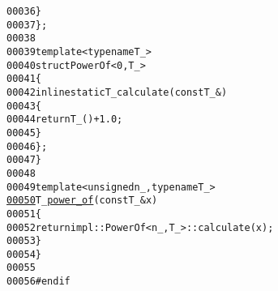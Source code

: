\begin{footnotesize}
\begin{alltt}
00036             \}
00037         \};
00038 
00039         \textcolor{keyword}{template} <\textcolor{keyword}{typename} T\_>
00040         \textcolor{keyword}{struct }PowerOf<0, T\_>
00041         \{
00042             \textcolor{keyword}{inline} \textcolor{keyword}{static} T\_ calculate(\textcolor{keyword}{const} T\_ &)
00043             \{
00044                 \textcolor{keywordflow}{return} T\_() + 1.0;
00045             \}
00046         \};
00047     \}
00048 
00049     \textcolor{keyword}{template} <\textcolor{keywordtype}{unsigned} n\_, \textcolor{keyword}{typename} T\_>
\hypertarget{power__of_8hh_source_l00050}{}\hyperlink{namespaceeos_a89d53e5e358a7428b14c811668193e3f}{00050}     T\_ \hyperlink{namespaceeos_a89d53e5e358a7428b14c811668193e3f}{power_of}(\textcolor{keyword}{const} T\_ & x)
00051     \{
00052         \textcolor{keywordflow}{return} impl::PowerOf<n\_, T\_>::calculate(x);
00053     \}
00054 \}
00055 
00056 \textcolor{preprocessor}{#endif}
\end{alltt}\end{footnotesize}
